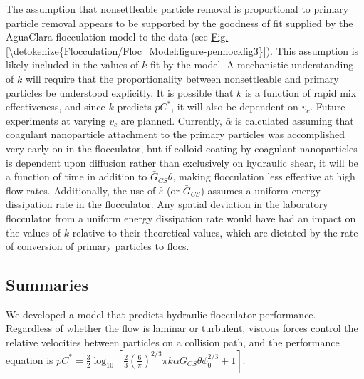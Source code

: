 \documentclass[letterpaper,10pt,english]{sphinxmanual}
\begin{document}
The assumption that nonsettleable particle removal is proportional to primary particle removal appears to be supported by the goodness of fit supplied by the AguaClara  flocculation model to the data (see \hyperref[\detokenize{Flocculation/Floc_Model:figure-pennockfig3}]{Fig.\@ \ref{\detokenize{Flocculation/Floc_Model:figure-pennockfig3}}}). This assumption is likely included in the values of \(k\) fit by the model. A mechanistic understanding of \(k\) will require that the proportionality between nonsettleable and primary particles be understood explicitly. It is possible that \(k\) is a function of rapid mix effectiveness, and since \(k\) predicts \(pC^*\), it will also be dependent on \(v_c\). Future experiments at varying \(v_c\) are planned. Currently, \(\bar{\alpha}\) is calculated assuming that coagulant nanoparticle attachment to the primary particles was accomplished very early on in the flocculator, but if colloid coating by coagulant nanoparticles is dependent upon diffusion rather than exclusively on hydraulic shear, it will be a function of time in addition to \(\bar G_{CS}\theta\), making flocculation less effective at high flow rates. Additionally, the use of \(\bar{\varepsilon}\) (or \(\bar G_{CS}\)) assumes a uniform energy dissipation rate in the flocculator. Any spatial deviation in the laboratory flocculator from a uniform energy dissipation rate would have had an impact on the values of \(k\) relative to their theoretical values, which are dictated by the rate of conversion of primary particles to flocs.


\subsection{Summaries}
\label{\detokenize{Flocculation/Floc_Model:summaries}}
We developed a model that predicts hydraulic flocculator performance. Regardless of whether the flow is laminar or turbulent, viscous forces control the relative velocities between particles on a collision path, and the performance equation is \(pC^*=\frac{3}{2}\log_{10}\left[\frac{2}{3}\left(\frac{6}{\pi}\right)^{2/3}\pi k\bar{\alpha}\bar G_{CS}\theta\phi_0^{2/3}+1\right]\).
\end{document}
